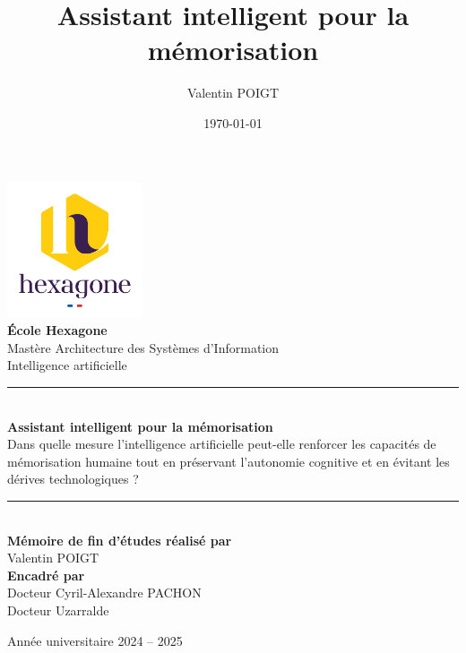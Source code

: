 \documentclass[11pt,a4paper]{report}
\title{Assistant intelligent pour la mémorisation}
\author{Valentin POIGT}
\date{\today}
\begin{document}
\justifying %

\begin{titlepage}
    \begin{center}
        \vspace*{\fill}

                \includegraphics[width=0.3\textwidth]{images/logo.png}\\[1cm]
                
                {\Large \textbf{École Hexagone}}\\[0.5cm]
                {\small Mastère Architecture des Systèmes d'Information}\\[0.5cm]
                {\small Intelligence artificielle}\\[0.5cm]

                \rule{\linewidth}{0.5mm}\\[1cm]
                
                {\LARGE \textbf{Assistant intelligent pour la mémorisation}} \\[0.5cm]
                {\Large Dans quelle mesure l’intelligence artificielle peut-elle renforcer les capacités de mémorisation humaine tout en préservant l’autonomie cognitive et en évitant les dérives technologiques ?}\\[0.5cm]

                \rule{\linewidth}{0.5mm}\\[1cm]
                
                \textbf{Mémoire de fin d'études réalisé par}\\
                {\Large Valentin POIGT}\\[1cm]
                
                \textbf{Encadré par}\\
                {\Large Docteur Cyril-Alexandre PACHON}\\[0.5cm]
                {\Large Docteur Uzarralde}\\[0.5cm]


                \vspace*{\fill}
                
                {\Large Année universitaire 2024 – 2025}
        \vspace*{\fill}
    \end{center}
\end{titlepage}
\end{document}

